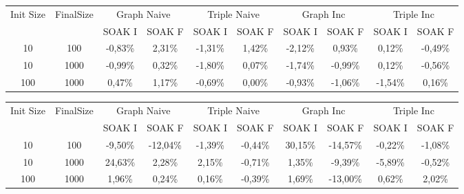 \begin{sidewaystable}
	\centering
	\scriptsize
	\begin{tabular}{c|c|cc|cc|cc|cc} %
	  	\hline
		Init Size&FinalSize &\multicolumn{2}{c}{Graph Naive}  &\multicolumn{2}{c}{Triple Naive}&\multicolumn{2}{c}{Graph Inc}  &\multicolumn{2}{c}{Triple Inc}\\\
		&& SOAK I & SOAK F& SOAK I & SOAK F& SOAK I & SOAK F& SOAK I & SOAK F\\
		\hline
		\hline
		10&100&-0,83\%&2,31\%&-1,31\%&1,42\%&-2,12\%&0,93\%&0,12\%&-0,49\%\\
		10&1000&-0,99\%&0,32\%&-1,80\%&0,07\%&-1,74\%&-0,99\%&0,12\%&-0,56\%\\
		100&1000&0,47\%&1,17\%&-0,69\%&0,00\%&-0,93\%&-1,06\%&-1,54\%&0,16\%\\
		\hline
	\end{tabular}
	\caption[\textsc{Analyser} Investigation Stack - Level 1 \\ Step Response Test Average Latency Comparison]{\textsc{Analyser} Investigation Stack - Level 1 - Step Response Test average latency comparison }
	\label{tab:step_latency_comparisons_mean}	
	
	\begin{tabular}{c|c|cc|cc|cc|cc} %
	  	\hline
		Init Size&FinalSize &\multicolumn{2}{c}{Graph Naive}  &\multicolumn{2}{c}{Triple Naive}&\multicolumn{2}{c}{Graph Inc}  &\multicolumn{2}{c}{Triple Inc}\\\
		&& SOAK I & SOAK F& SOAK I & SOAK F& SOAK I & SOAK F& SOAK I & SOAK F\\
		\hline
		\hline
		10&100&-9,50\%&-12,04\%&-1,39\%&-0,44\%&30,15\%&-14,57\%&-0,22\%&-1,08\%\\
		10&1000&24,63\%&2,28\%&2,15\%&-0,71\%&1,35\%&-9,39\%&-5,89\%&-0,52\%\\
		100&1000&1,96\%&0,24\%&0,16\%&-0,39\%&1,69\%&-13,00\%&0,62\%&2,02\%\\
		\hline
	\end{tabular}
	\caption[\textsc{Analyser} Investigation Stack - Level 1 \\ Step Response Test Average Memory Comparison]{\textsc{Analyser} Investigation Stack - Level 1 - Step Response Test average memory comparison }
	\label{tab:step_memory_comparisons_mean}



\end{sidewaystable}
